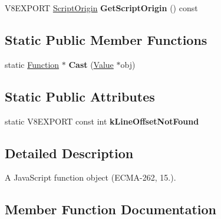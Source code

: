 \begin{DoxyCompactItemize}
\item 
\hypertarget{classv8_1_1_function_a9dfe892a6af9d2799abe3e24e726c0b1}{}V8\+E\+X\+P\+O\+R\+T \hyperlink{classv8_1_1_script_origin}{Script\+Origin} {\bfseries Get\+Script\+Origin} () const \label{classv8_1_1_function_a9dfe892a6af9d2799abe3e24e726c0b1}

\end{DoxyCompactItemize}
\subsection*{Static Public Member Functions}
\begin{DoxyCompactItemize}
\item 
\hypertarget{classv8_1_1_function_af24f38bcc0769519816cda1f6a154ff8}{}static \hyperlink{classv8_1_1_function}{Function} $\ast$ {\bfseries Cast} (\hyperlink{classv8_1_1_value}{Value} $\ast$obj)\label{classv8_1_1_function_af24f38bcc0769519816cda1f6a154ff8}

\end{DoxyCompactItemize}
\subsection*{Static Public Attributes}
\begin{DoxyCompactItemize}
\item 
\hypertarget{classv8_1_1_function_ae8687c89a18c0811d799becfba666406}{}static V8\+E\+X\+P\+O\+R\+T const int {\bfseries k\+Line\+Offset\+Not\+Found}\label{classv8_1_1_function_ae8687c89a18c0811d799becfba666406}

\end{DoxyCompactItemize}


\subsection{Detailed Description}
A Java\+Script function object (E\+C\+M\+A-\/262, 15.). 

\subsection{Member Function Documentation}
\hypertarget{classv8_1_1_function_a2eff94c159ec39792bf3ec52c81e045c}{}
